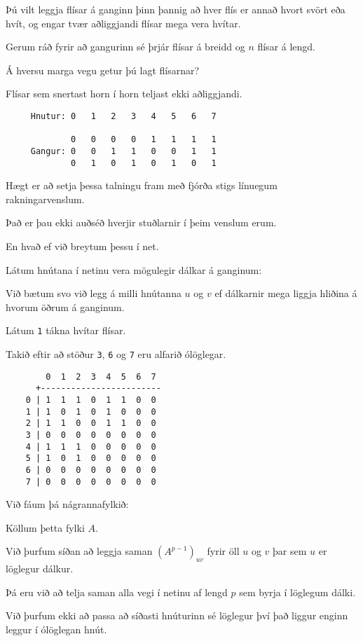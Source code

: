 {
	{
		\item<1-> Þú vilt leggja flísar á ganginn þinn þannig að hver flís er annað hvort svört eða hvít,
					og engar tvær aðliggjandi flísar mega vera hvítar.
		\item<2-> Gerum ráð fyrir að gangurinn sé þrjár flísar á breidd og $n$ flísar á lengd.
		\item<3-> Á hversu marga vegu getur þú lagt flísarnar?
		\item<4-> Flísar sem snertast horn í horn teljast ekki aðliggjandi.
	}
}

{ \begin{verbatim}
     Hnutur: 0   1   2   3   4   5   6   7

             0   0   0   0   1   1   1   1
     Gangur: 0   0   1   1   0   0   1   1
             0   1   0   1   0   1   0   1
\end{verbatim}}
{
	{
		\item<1-> Hægt er að setja þessa talningu fram með fjórða stigs línuegum rakningarvenslum.
		\item<2-> Það er þau ekki auðséð hverjir stuðlarnir í þeim venslum erum.
		\item<3-> En hvað ef við breytum þessu í net.
		\item<4-> Látum hnútana í netinu vera mögulegir dálkar á ganginum:
		\item<5->[] \gangar
		\item<6-> Við bætum svo við legg á milli hnútanna $u$ og $v$ ef dálkarnir mega liggja hliðina á hvorum öðrum á ganginum.
		\item<7-> Látum \texttt{1} tákna hvítar flísar.
		\item<8-> Takið eftir að stöður \texttt{3}, \texttt{6} og \texttt{7} eru alfarið ólöglegar.
	}
}

{ \begin{verbatim}
        0  1  2  3  4  5  6  7
      +------------------------
    0 | 1  1  1  0  1  1  0  0
    1 | 1  0  1  0  1  0  0  0
    2 | 1  1  0  0  1  1  0  0
    3 | 0  0  0  0  0  0  0  0
    4 | 1  1  1  0  0  0  0  0
    5 | 1  0  1  0  0  0  0  0
    6 | 0  0  0  0  0  0  0  0
    7 | 0  0  0  0  0  0  0  0
\end{verbatim}}
{
	{
		\item<1-> Við fáum þá nágrannafylkið:
		\item<2->[] \gangarfylki
		\item<3-> Köllum þetta fylki $A$.
		\item<4-> Við þurfum síðan að leggja saman $(A^{p - 1})_{uv}$ fyrir öll $u$ og $v$ þar sem $u$ er löglegur dálkur.
		\item<5-> Þá eru við að telja saman alla vegi í netinu af lengd $p$ sem byrja í löglegum dálki.
		\item<6-> Við þurfum ekki að passa að síðasti hnúturinn sé löglegur því það liggur enginn leggur í ólöglegan hnút.
	}
}

